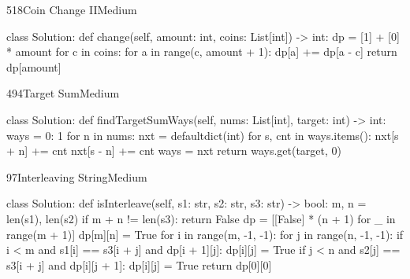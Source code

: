 \begin{problem}{518}{Coin Change II}{Medium}
\begin{code}
class Solution:
    def change(self, amount: int, coins: List[int]) -> int:
        dp = [1] + [0] * amount
        for c in coins:
            for a in range(c, amount + 1):
                dp[a] += dp[a - c]
        return dp[amount]
\end{code}
\end{problem}

\begin{problem}{494}{Target Sum}{Medium}
\begin{code}
class Solution:
    def findTargetSumWays(self, nums: List[int], target: int) -> int:
        ways = {0: 1}
        for n in nums:
            nxt = defaultdict(int)
            for s, cnt in ways.items():
                nxt[s + n] += cnt
                nxt[s - n] += cnt
            ways = nxt
        return ways.get(target, 0)
\end{code}
\end{problem}

\begin{problem}{97}{Interleaving String}{Medium}
\begin{code}
class Solution:
    def isInterleave(self, s1: str, s2: str, s3: str) -> bool:
        m, n = len(s1), len(s2)
        if m + n != len(s3):
            return False
        dp = [[False] * (n + 1) for _ in range(m + 1)]
        dp[m][n] = True
        for i in range(m, -1, -1):
            for j in range(n, -1, -1):
                if i < m and s1[i] == s3[i + j] and dp[i + 1][j]:
                    dp[i][j] = True
                if j < n and s2[j] == s3[i + j] and dp[i][j + 1]:
                    dp[i][j] = True
        return dp[0][0]
\end{code}
\end{problem}

